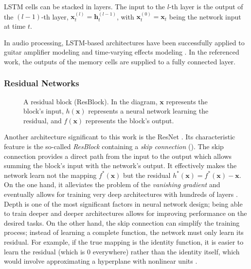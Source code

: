\ac{LSTM} cells can be stacked in layers. The input to the $l$-th layer is the output of the $(l-1)$-th layer, $\pmb{x}_t^{(l)} = \pmb{h}_t^{(l-1)}$, with $\pmb{x}_t^{(0)} = \pmb{x}_t$ being the network input at time $t$.

In audio processing, \ac{LSTM}-based architectures have been successfully applied to guitar amplifier modeling \cite{Wright2019,Wrightetal2020} and time-varying effects modeling \cite{Wright2020}. In the referenced work, the outputs of the memory cells are supplied to a fully connected layer.

\subsubsection{Residual Networks}

\begin{figure}
  \centering
  
  \caption{A residual block (ResBlock). In the diagram, $\pmb{x}$ represents the block's input, $h(\pmb{x})$ represents a neural network learning the residual, and $f(\pmb{x})$ represents the block's output.}
  \label{fig:resblock}
\end{figure}

Another architecture significant to this work is the \ac{ResNet} \cite{He2015}. Its characteristic feature is the so-called \emph{\ac{ResBlock}} containing a \emph{skip connection} (). The skip connection provides a direct path from the input to the output which allows summing the block's input with the network's output. It effectively makes the network learn not the mapping $f^*(\pmb{x})$ but the residual $h^*(\pmb{x}) = f^*(\pmb{x}) - \pmb{x}$. On the one hand, it alleviates the problem of the \emph{vanishing gradient} \cite{Goodfellow-et-al-2016} and eventually allows for training very deep architectures with hundreds of layers \cite{He2015}. Depth is one of the most significant factors in neural network design; being able to train deeper and deeper architectures allows for improving performance on the desired tasks. On the other hand, the skip connection can simplify the training process; instead of learning a complete function, the network must only learn its residual. For example, if the true mapping is the identity function, it is easier to learn the residual (which is $0$ everywhere) rather than the identity itself, which would involve approximating a hyperplane with nonlinear units \cite{He2015}.


